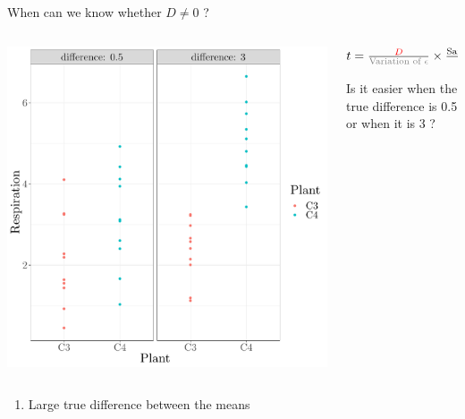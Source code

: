 \documentclass{beamer}
\begin{document}
\begin{frame}{When can we know whether $D \neq 0$ ?}

 \begin{columns}
 \begin{column}{0.5\textwidth}
 \includegraphics[width=\textwidth]{Figures/figure/ttestdiff-1}
 \end{column}
 \begin{column}{0.5\textwidth}
  $ t = \frac{\color{red}{D}}{\text{\color{gray}{Variation of }}\color{gray}{\epsilon}} \times \frac{\text{Sample Size}}{\sqrt{2}}$

  \vspace{1cm}
  Is it easier when the true difference is 0.5 or when it is 3 ?
 \end{column}
 \end{columns}
 
 \pause
 \begin{alertblock}{}
  \begin{enumerate}
   \item Large true difference between the means
  \end{enumerate}
 \end{alertblock}

\end{frame}
\end{document}
